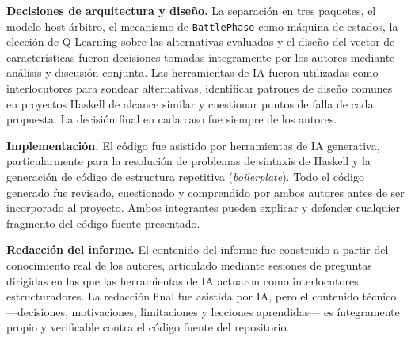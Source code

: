 \textbf{Decisiones de arquitectura y diseño.} La separación en tres paquetes, el modelo host-árbitro, el mecanismo de \texttt{BattlePhase} como máquina de estados, la elección de Q-Learning sobre las alternativas evaluadas y el diseño del vector de características fueron decisiones tomadas íntegramente por los autores mediante análisis y discusión conjunta. Las herramientas de IA fueron utilizadas como interlocutores para sondear alternativas, identificar patrones de diseño comunes en proyectos Haskell de alcance similar y cuestionar puntos de falla de cada propuesta. La decisión final en cada caso fue siempre de los autores.

\textbf{Implementación.} El código fue asistido por herramientas de IA generativa, particularmente para la resolución de problemas de sintaxis de Haskell y la generación de código de estructura repetitiva (\textit{boilerplate}). Todo el código generado fue revisado, cuestionado y comprendido por ambos autores antes de ser incorporado al proyecto. Ambos integrantes pueden explicar y defender cualquier fragmento del código fuente presentado.

\textbf{Redacción del informe.} El contenido del informe fue construido a partir del conocimiento real de los autores, articulado mediante sesiones de preguntas dirigidas en las que las herramientas de IA actuaron como interlocutores estructuradores. La redacción final fue asistida por IA, pero el contenido técnico —decisiones, motivaciones, limitaciones y lecciones aprendidas— es íntegramente propio y verificable contra el código fuente del repositorio.

\clearpage
